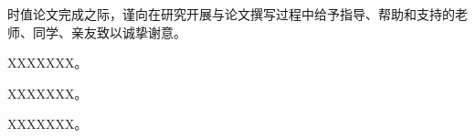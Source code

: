 \label{chap:acknowledgements}

\vspace{0.5\baselineskip}

时值论文完成之际，谨向在研究开展与论文撰写过程中给予指导、帮助和支持的老师、同学、亲友致以诚挚谢意。

XXXXXXX。

XXXXXXX。

XXXXXXX。